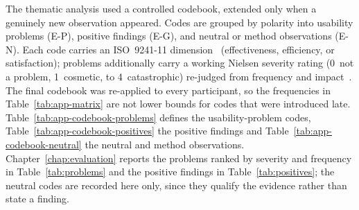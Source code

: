 The thematic analysis used a controlled codebook, extended only when a genuinely new observation appeared. Codes are grouped by polarity into usability problems (\mbox{E-P}), positive findings (\mbox{E-G}), and neutral or method observations (\mbox{E-N}). Each code carries an ISO~9241-11 dimension~\cite{iso9241_11} (effectiveness, efficiency, or satisfaction); problems additionally carry a working Nielsen severity rating (0~not a problem, 1~cosmetic, to 4~catastrophic) re-judged from frequency and impact~\cite[pp.~102--103]{nielsen1993}. The final codebook was re-applied to every participant, so the frequencies in Table~\ref{tab:app-matrix} are not lower bounds for codes that were introduced late.
Table~\ref{tab:app-codebook-problems} defines the usability-problem codes, Table~\ref{tab:app-codebook-positives} the positive findings and Table~\ref{tab:app-codebook-neutral} the neutral and method observations. Chapter~\ref{chap:evaluation} reports the problems ranked by severity and frequency in Table~\ref{tab:problems} and the positive findings in Table~\ref{tab:positives}; the neutral codes are recorded here only, since they qualify the evidence rather than state a finding.

